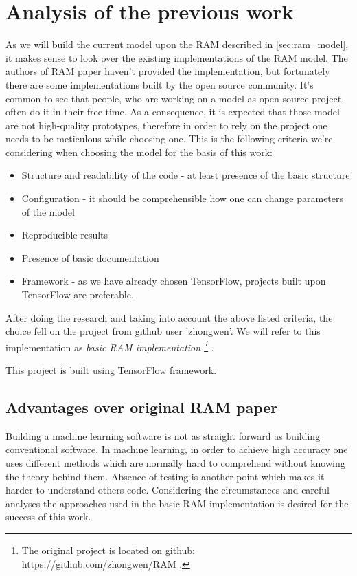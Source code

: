 \section{Analysis of the previous work}
As we will build the current model upon the RAM described
in \autoref{sec:ram_model}, it makes sense to look over the existing implementations
of the RAM model.
The authors of RAM paper haven't provided the implementation, but
fortunately there are some implementations built by the open source community.
It's common to see that people, who are working on a model as open source project,
often do it in their free time. As a consequence, it is expected that those model
are not high-quality prototypes, therefore in order to rely on the project
one needs to be meticulous while choosing one.
This is the following criteria we're considering when choosing the model for the basis
of this work:

\begin{itemize}
	\item Structure and readability of the code - at least presence of the basic structure
	\item Configuration - it should be comprehensible how one can change parameters
		of the model
	\item Reproducible results
	\item Presence of basic documentation
	\item Framework - as we have already chosen TensorFlow, projects built upon
		TensorFlow are preferable.
\end{itemize}

After doing the research and taking into account the above listed criteria,
the choice fell on the project from github user 'zhongwen'. We will refer to
this implementation as \emph{
	basic RAM implementation
	\footnote{The original project is located on github: https://github.com/zhongwen/RAM .}
}.

This project is built using TensorFlow framework.

\subsection{Advantages over original RAM paper}
Building a machine learning software is not as straight forward as building
conventional software. In machine learning, in order to achieve high accuracy
one uses different methods which are normally hard to comprehend without knowing
the theory behind them. Absence of testing is another point which makes it
harder to understand others code. Considering the circumstances and careful
analyses the approaches used in the basic RAM implementation
is desired for the success of this work.

